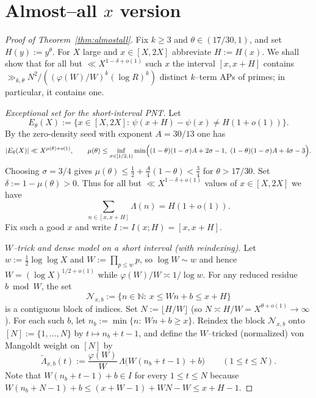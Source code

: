 \documentclass[11pt]{amsart}
\theoremstyle{definition}
\theoremstyle{remark}
\numberwithin{equation}{section}
\begin{document}
\section{Almost--all $x$ version}\label{sec:almost-all}
\begin{proof}[Proof of Theorem~\ref{thm:almostall}]
Fix $k\ge3$ and $\theta\in(17/30,1)$, and set $H(y):=y^{\theta}$. For $X$ large and $x\in[X,2X]$ abbreviate $H:=H(x)$. We shall show that for all but $\ll X^{1-\delta+o(1)}$ such $x$ the interval $[x,x+H]$ contains $\gg_{k,\theta} N^2/((\varphi(W)/W)^k(\log R)^k)$ distinct $k$--term APs of primes; in particular, it contains one.

\smallskip
\noindent\emph{Exceptional set for the short-interval PNT.}
Let
\[
E_{\theta}(X):=\bigl\{x\in[X,2X]:\, \psi(x+H)-\psi(x)\ne H(1+o(1))\bigr\}.
\]
By the zero-density seed with exponent $A=30/13$ one has
\[
|E_{\theta}(X)|\ll X^{\mu(\theta)+o(1)},\qquad \mu(\theta)\le\inf_{\sigma\in[1/2,1)}\min\Bigl((1-\theta)(1-\sigma)A+2\sigma-1,\ (1-\theta)(1-\sigma)A+4\sigma-3\Bigr).
\]
Choosing $\sigma=3/4$ gives $\mu(\theta)\le\tfrac12+\tfrac A4(1-\theta)<\tfrac34$ for $\theta>17/30$. Set $\delta:=1-\mu(\theta)>0$. Thus for all but $\ll X^{1-\delta+o(1)}$ values of $x\in[X,2X]$ we have
\begin{equation}\label{eq:SIgood}
\sum_{n\in[x,x+H]}\!\Lambda(n)=H(1+o(1)).
\end{equation}
Fix such a good $x$ and write $I:=I(x;H)=[x,x+H]$.

\smallskip
\noindent\emph{$W$--trick and dense model on a short interval (with reindexing).}
Let $w:=\tfrac12\log\log X$ and $W:=\prod_{p\le w}p$, so $\log W\sim w$ and hence $W=(\log X)^{1/2+o(1)}$ while $\varphi(W)/W\asymp1/\log w$. For any reduced residue $b\bmod W$, the set
\[
\mathcal{N}_{x,b}:=\{n\in\mathbb N:\ x\le Wn+b\le x+H\}
\]
is a contiguous block of indices. Set $N:=\lfloor H/W\rfloor$ (so $N\asymp H/W=X^{\theta+o(1)}\to\infty$). For each such $b$, let $n_b:=\min\{n:\ Wn+b\ge x\}$. Reindex the block $\mathcal{N}_{x,b}$ onto $[N]:=\{1,\dots,N\}$ by $t\mapsto n_b+t-1$, and define the $W$--tricked (normalized) von Mangoldt weight on $[N]$ by
\begin{equation}\label{eq:Ltib}
\tilde\Lambda_{x,b}(t):=\frac{\varphi(W)}{W}\,\Lambda\bigl(W(n_b+t-1)+b\bigr)\qquad(1\le t\le N).
\end{equation}
Note that $W(n_b+t-1)+b\in I$ for every $1\le t\le N$ because $W(n_b+N-1)+b\le (x+W-1)+WN-W\le x+H-1$.


\end{proof}
\end{document}
